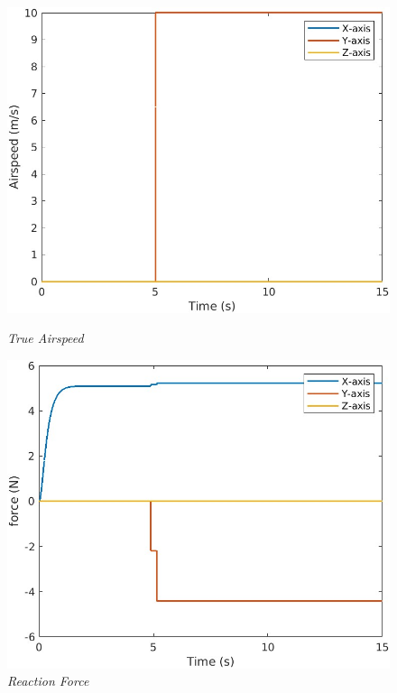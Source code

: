 \begin{figure}[htbp]
  \centering
  \begin{minipage}[b]{0.3\textwidth}
    \centering
    \includegraphics[width=\textwidth]{Images/Gust/FIXED/1 airspeed_3.jpg}
    \caption*{\textit{True Airspeed}}
  \end{minipage}
  \hfil
  \begin{minipage}[b]{0.3\textwidth}
    \centering
    \includegraphics[width=\textwidth]{Images/Gust/FIXED/2 force_3.jpg}
    \caption*{\textit{Reaction Force}}
  \end{minipage}
  \hfil
  \begin{minipage}[b]{0.3\textwidth}

\end{minipage}
\end{figure}
